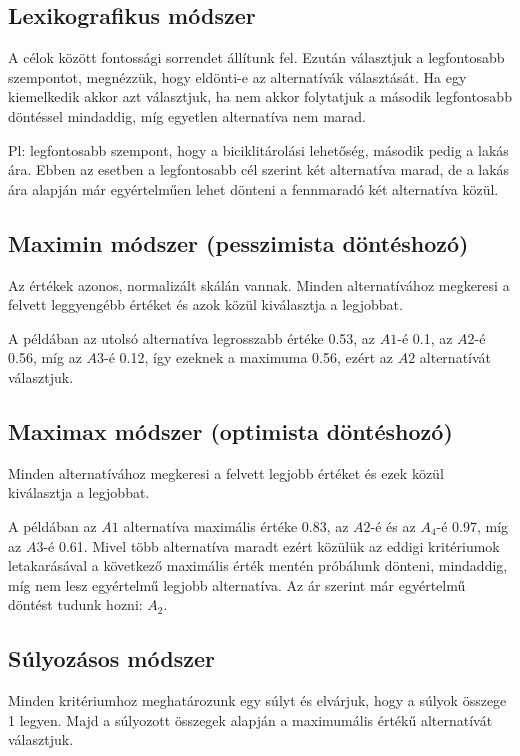 \documentclass[a4paper,12pt]{article}
\begin{document}
\subsection{Lexikografikus módszer}

A célok között fontossági sorrendet állítunk fel. Ezután választjuk a legfontosabb szempontot, megnézzük, hogy eldönti-e az alternatívák választását. Ha egy kiemelkedik akkor azt választjuk, ha nem akkor folytatjuk a második legfontosabb döntéssel mindaddig, míg egyetlen alternatíva nem marad.

Pl: legfontosabb szempont, hogy a biciklitárolási lehetőség, második pedig a lakás ára. Ebben az esetben a legfontosabb cél szerint két alternatíva marad, de a lakás ára alapján már egyértelműen lehet dönteni a fennmaradó két alternatíva közül.

\subsection{Maximin módszer (pesszimista döntéshozó)}

Az értékek azonos, normalizált skálán vannak. Minden alternatívához megkeresi a felvett leggyengébb értéket és azok közül kiválasztja a legjobbat.

A példában az utolsó alternatíva legrosszabb értéke 0.53, az $A1$-é 0.1, az $A2$-é 0.56, míg az $A3$-é 0.12, így ezeknek a maximuma 0.56, ezért az $A2$ alternatívát választjuk.

\subsection{Maximax módszer (optimista döntéshozó)}

Minden alternatívához megkeresi a felvett legjobb értéket és ezek közül kiválasztja a legjobbat.

A példában az $A1$ alternatíva maximális értéke 0.83, az $A2$-é és az  $A_4$-é  0.97, míg az $A3$-é 0.61. Mivel több alternatíva maradt ezért közülük az eddigi kritériumok letakarásával a következő maximális érték mentén próbálunk dönteni, mindaddig, míg nem lesz egyértelmű legjobb alternatíva. Az ár szerint már egyértelmű döntést tudunk hozni: $A_2$.


\subsection{Súlyozásos módszer}

Minden kritériumhoz meghatározunk egy súlyt és elvárjuk, hogy a súlyok összege 1 legyen. Majd a súlyozott összegek alapján a maximumális értékű alternatívát választjuk. 
\end{document}
